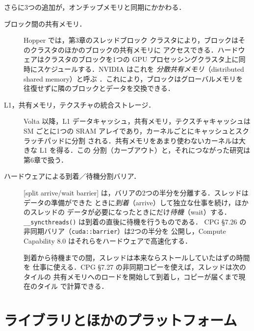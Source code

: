 \documentclass[../main.tex]{subfiles}
\begin{document}
さらに3つの追加が，オンチップメモリと同期にかかわる．
\begin{description}
  \item[ブロック間の共有メモリ．]  Hopper では，第3章のスレッドブロック
    クラスタにより，ブロックはそのクラスタのほかのブロックの共有メモリに
    アクセスできる．ハードウェアはクラスタのブロックを1つの GPU
    プロセッシングクラスタ上に同時にスケジュールする．NVIDIA はこれを
    \emph{分散共有メモリ}（distributed shared memory）と呼ぶ
    \cite{nvidia2022hopper}．これにより，ブロックはグローバルメモリを
    往復せずに隣のブロックとデータを交換できる．
  \item[L1，共有メモリ，テクスチャの統合ストレージ．]  Volta 以降，L1
    データキャッシュ，共有メモリ，テクスチャキャッシュは SM ごとに1つの
    SRAM アレイであり，カーネルごとにキャッシュとスクラッチパッドに分割
    される．共有メモリをあまり使わないカーネルは大きな L1 を得る．この
    分割（カーブアウト）と，それにつながった研究は第6章で扱う．
  \item[ハードウェアによる到着／待機分割バリア．]
    \begin{definition}
      [split arrive/wait barrier]
      は，バリアの2つの半分を分離する．スレッドはデータの準備ができた
      ときに\emph{到着}（arrive）して独立な仕事を続け，ほかのスレッドの
      データが必要になったときにだけ\emph{待機}（wait）する．
      \texttt{\_\_syncthreads()} は到着の直後に待機を行うものである．
      CPG §7.26 の非同期バリア（\texttt{cuda::barrier}）は2つの半分を
      公開し，Compute Capability 8.0 はそれらをハードウェアで高速化する．
    \end{definition}
    到着から待機までの間，スレッドは本来ならストールしていたはずの時間を
    仕事に使える．CPG §7.27 の非同期コピーを使えば，スレッドは次のタイルの
    共有メモリへのロードを開始して到着し，コピーが届くまで現在のタイル
    で計算できる．
\end{description}

\section{ライブラリとほかのプラットフォーム}
\label{sec:l05-libraries}
\end{document}
